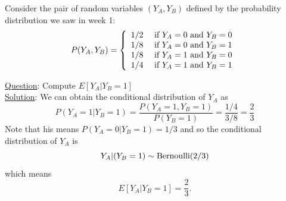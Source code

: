 \begin{example}
Consider the pair of random variables $(Y_A,Y_B)$ defined by the probability distribution we saw in week 1:
\begin{equation}\label{eq:gene}
P(Y_A,Y_B) = \left\{ \begin{array}{cc}
1/2 & \text{ if }Y_A=0 \text{ and } Y_B = 0\\
1/8 & \text{ if }Y_A=0 \text{ and } Y_B = 1\\
1/8 & \text{ if }Y_A=1 \text{ and } Y_B = 0\\
1/4 & \text{ if }Y_A=1 \text{ and } Y_B = 1\\
\end{array}
 \right.\\
\end{equation}


\noindent
\underline{Question}: Compute $E[Y_A|Y_B=1]$\\

\noindent
\underline{Solution}: We can obtain the conditional distribution of $Y_A$ as 
\begin{equation*}
P(Y_A=1|Y_B = 1) = \frac{P(Y_A=1,Y_B=1)}{P(Y_B=1)} = \frac{1/4}{3/8} = \frac{2}{3}
\end{equation*}
Note that his means $P(Y_A=0|Y_B = 1) = 1/3$ and so the conditional distribution of  $Y_A$ is 
\begin{equation*}
Y_A|(Y_B=1) \sim {\rm Bernoulli}(2/3)
\end{equation*}
which means 
\begin{equation*}
E[Y_A|Y_B=1] = \frac{2}{3}.
\end{equation*}

\end{example}


